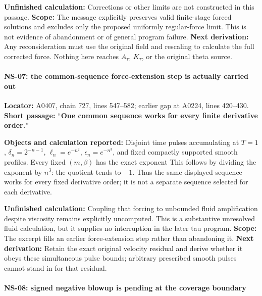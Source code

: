 \textbf{Unfinished calculation:} Corrections or other limits are not
constructed in this passage. \textbf{Scope:} The message explicitly
preserves valid finite-stage forced solutions and excludes only the
proposed uniformly regular-force limit. This is not evidence of
abandonment or of general program failure. \textbf{Next derivation:} Any
reconsideration must use the original field and rescaling to calculate
the full corrected force. Nothing here reaches \(A_\tau\), \(K_\tau\),
or the original theta source.

\paragraph{NS-07: the common-sequence force-extension step is actually
carried
out}\label{TranscriptLedgerStage:ns-07-the-common-sequence-force-extension-step-is-actually-carried-out}

\textbf{Locator:} A0407, chain 727, lines 547--582; earlier gap at
A0224, lines 420--430. \textbf{Short passage:} ``\textbf{One common
sequence works for every finite derivative order.}''

\textbf{Objects and calculation reported:} Disjoint time pulses
accumulating at \(T=1\), \(\delta_n=2^{-n-1}\), \(\ell_n=e^{-n^2}\),
\(\epsilon_n=e^{-n^3}\), and fixed compactly supported smooth profiles.
Every fixed \((m,\beta)\) has the exact exponent  This follows by dividing the exponent by \(n^3\): the quotient tends
to \(-1\). Thus the same displayed sequence works for every fixed
derivative order; it is not a separate sequence selected for each
derivative.

\textbf{Unfinished calculation:} Coupling that forcing to unbounded
fluid amplification despite viscosity remains explicitly uncomputed.
This is a substantive unresolved fluid calculation, but it supplies no
interruption in the later tau program. \textbf{Scope:} The excerpt fills
an earlier force-extension step rather than abandoning it. \textbf{Next
derivation:} Retain the exact original velocity residual and derive
whether it obeys these simultaneous pulse bounds; arbitrary prescribed
smooth pulses cannot stand in for that residual.

\paragraph{NS-08: signed negative blowup is pending at the coverage
boundary}\label{TranscriptLedgerStage:ns-08-signed-negative-blowup-is-pending-at-the-coverage-boundary}

